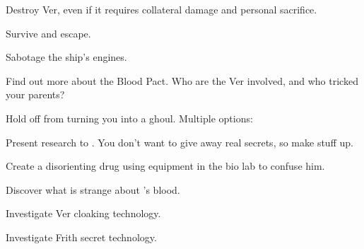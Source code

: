 \documentclass[char]{guildcamp4}
\begin{document}
\begin{itemz}[Goals]
	\item Destroy Ver, even if it requires collateral damage and personal sacrifice.
	\item Survive and escape.
	\item Sabotage the ship's engines.
	\item Find out more about the Blood Pact. Who are the Ver involved, and who tricked your parents?
	\item Hold off \cVone{} from turning you into a ghoul. Multiple options:
		\begin {itemz}
			\item Present research to \cVone{}. You don't want to give away real secrets, so make stuff up.
			\item Create a disorienting drug using equipment in the bio lab to confuse him.
		\end {itemz}
	\item Discover what is strange about \cPlead{}'s blood.
	\item Investigate Ver cloaking technology.
	\item Investigate Frith secret technology.
\end{itemz}

\begin{itemz}[Notes]
	\item 
\end{itemz}

\begin{contacts}
	\contact{\cTest{}}
\end{contacts}
\end{document}
